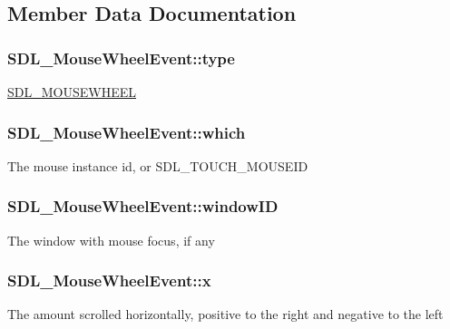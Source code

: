 \subsection{Member Data Documentation}
\hypertarget{structSDL__MouseWheelEvent_aa6b741e99df708c6f9550ee0f520fb70}{}
\subsubsection[{type}]{ S\+D\+L\+\_\+\+Mouse\+Wheel\+Event\+::type}\label{structSDL__MouseWheelEvent_aa6b741e99df708c6f9550ee0f520fb70}
\hyperlink{SDL__events_8h_a3b589e89be6b35c02e0dd34a55f3fccaa63135c2e0aea2286f05066f3c0bc5c4e}{S\+D\+L\+\_\+\+M\+O\+U\+S\+E\+W\+H\+E\+E\+L} \hypertarget{structSDL__MouseWheelEvent_a014dc767d52e8b75ba26a5f12e1704e8}{}
\subsubsection[{which}]{ S\+D\+L\+\_\+\+Mouse\+Wheel\+Event\+::which}\label{structSDL__MouseWheelEvent_a014dc767d52e8b75ba26a5f12e1704e8}
The mouse instance id, or S\+D\+L\+\_\+\+T\+O\+U\+C\+H\+\_\+\+M\+O\+U\+S\+E\+I\+D \hypertarget{structSDL__MouseWheelEvent_ab45eb1895217214ecb773fc555e08f6c}{}
\subsubsection[{window\+I\+D}]{ S\+D\+L\+\_\+\+Mouse\+Wheel\+Event\+::window\+I\+D}\label{structSDL__MouseWheelEvent_ab45eb1895217214ecb773fc555e08f6c}
The window with mouse focus, if any \hypertarget{structSDL__MouseWheelEvent_a6d904eef474ea45a5b1828fcb5b0f859}{}
\subsubsection[{x}]{ S\+D\+L\+\_\+\+Mouse\+Wheel\+Event\+::x}\label{structSDL__MouseWheelEvent_a6d904eef474ea45a5b1828fcb5b0f859}
The amount scrolled horizontally, positive to the right and negative to the left \hypertarget{structSDL__MouseWheelEvent_a53fdf77a464426bc8b30e629795f044b}{}
